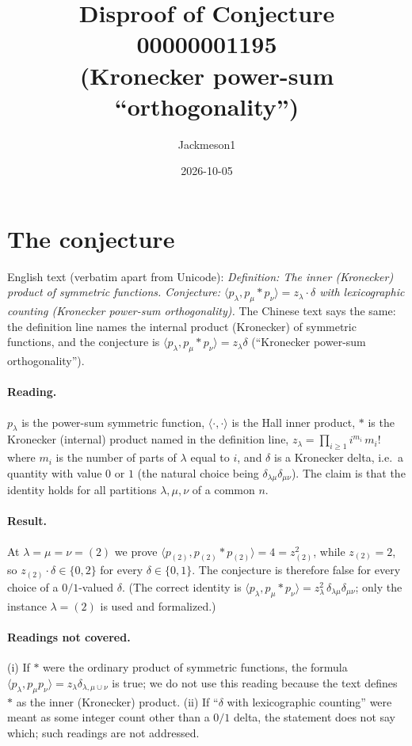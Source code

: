 \documentclass[11pt]{article}
\title{Disproof of Conjecture 00000001195\\(Kronecker power-sum ``orthogonality'')}
\author{Jackmeson1}
\date{2026-10-05}
\theoremstyle{remark}
\begin{document}
\maketitle

\section{The conjecture}

English text (verbatim apart from Unicode): \emph{Definition: The inner (Kronecker) product of
symmetric functions. Conjecture: $\langle p_\lambda, p_\mu * p_\nu\rangle = z_\lambda\cdot\delta$
with lexicographic counting (Kronecker power-sum orthogonality).} The Chinese text says the same:
the definition line names the internal product (Kronecker) of symmetric functions, and the
conjecture is $\langle p_\lambda, p_\mu * p_\nu\rangle = z_\lambda\delta$ (``Kronecker power-sum
orthogonality'').

\paragraph{Reading.} $p_\lambda$ is the power-sum symmetric function, $\langle\cdot,\cdot\rangle$ is
the Hall inner product, $*$ is the Kronecker (internal) product named in the definition line,
$z_\lambda=\prod_{i\ge1} i^{m_i}\,m_i!$ where $m_i$ is the number of parts of $\lambda$ equal to
$i$, and $\delta$ is a Kronecker delta, i.e.\ a quantity with value $0$ or $1$ (the natural choice
being $\delta_{\lambda\mu}\delta_{\mu\nu}$). The claim is that the identity holds for all partitions
$\lambda,\mu,\nu$ of a common $n$.

\paragraph{Result.} At $\lambda=\mu=\nu=(2)$ we prove
$\langle p_{(2)}, p_{(2)} * p_{(2)}\rangle = 4 = z_{(2)}^2$, while $z_{(2)}=2$, so
$z_{(2)}\cdot\delta\in\{0,2\}$ for every $\delta\in\{0,1\}$. The conjecture is therefore false
for every choice of a $0/1$-valued $\delta$. (The correct identity is
$\langle p_\lambda, p_\mu * p_\nu\rangle = z_\lambda^2\,\delta_{\lambda\mu}\delta_{\mu\nu}$; only
the instance $\lambda=(2)$ is used and formalized.)

\paragraph{Readings not covered.} (i) If $*$ were the ordinary product of symmetric functions,
the formula $\langle p_\lambda, p_\mu p_\nu\rangle = z_\lambda\delta_{\lambda,\mu\cup\nu}$ is true;
we do not use this reading because the text defines $*$ as the inner (Kronecker) product.
(ii) If ``$\delta$ with lexicographic counting'' were meant as some integer count other than a
$0/1$ delta, the statement does not say which; such readings are not addressed.
\end{document}

